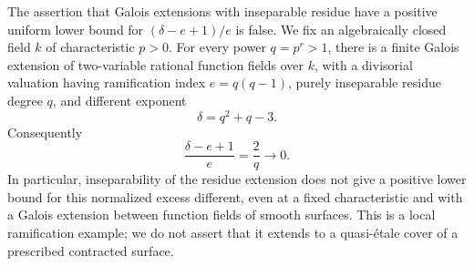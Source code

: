 \begin{example}
\label{D:fierce-small-excess}
The assertion that Galois extensions with inseparable residue have a
positive uniform lower bound for $(\delta-e+1)/e$ is false.
We fix an algebraically closed field $k$ of characteristic $p>0$.
For every power $q=p^r>1$, there is a finite Galois extension of
two-variable rational function fields over $k$, with a divisorial valuation
having ramification index $e=q(q-1)$, purely inseparable residue degree $q$,
and different exponent
\[
  \delta=q^2+q-3.
\]
Consequently
\[
  \frac{\delta-e+1}{e}=\frac2q\longrightarrow0.
\]
In particular, inseparability of the residue extension does not give a
positive lower bound for this normalized excess different, even at a fixed
characteristic and with a Galois extension between function fields of smooth
surfaces.  This is a local ramification example; we do not assert that it
extends to a quasi-\'etale cover of a prescribed contracted surface.
\end{example}

